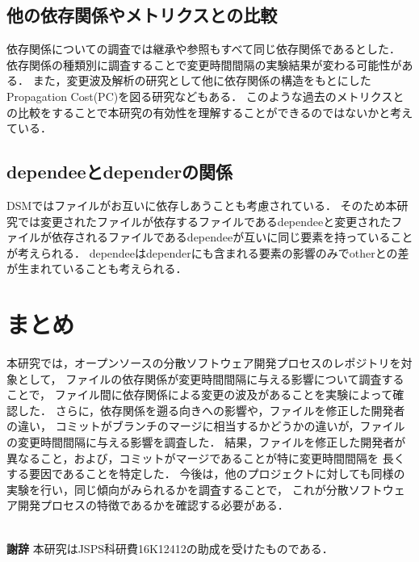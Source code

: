 \documentclass{fose2016}           %
\begin{document}
\subsection*{他の依存関係やメトリクスとの比較}
依存関係についての調査では継承や参照もすべて同じ依存関係であるとした．
依存関係の種類\cite{Kotani}別に調査することで変更時間間隔の実験結果が変わる可能性がある．
また，変更波及解析の研究として他に依存関係の構造をもとにしたPropagation Cost(PC)を図る研究などもある\cite{Nord}．
このような過去のメトリクスとの比較をすることで本研究の有効性を理解することができるのではないかと考えている．

\subsection*{dependeeとdependerの関係}
DSM\cite{Nord}ではファイルがお互いに依存しあうことも考慮されている．
そのため本研究では変更されたファイルが依存するファイルであるdependeeと変更されたファイルが依存されるファイルであるdependeeが互いに同じ要素を持っていることが考えられる．
dependeeはdependerにも含まれる要素の影響のみでotherとの差が生まれていることも考えられる．

\section{まとめ} \label{まとめ}
本研究では，オープンソースの分散ソフトウェア開発プロセスのレポジトリを対象として，
ファイルの依存関係が変更時間間隔に与える影響について調査することで，
ファイル間に依存関係による変更の波及があることを実験によって確認した．
さらに，依存関係を遡る向きへの影響や，ファイルを修正した開発者の違い，
コミットがブランチのマージに相当するかどうかの違いが，ファイルの変更時間間隔に与える影響を調査した．
結果，ファイルを修正した開発者が異なること，および，コミットがマージであることが特に変更時間間隔を
長くする要因であることを特定した．
今後は，他のプロジェクトに対しても同様の実験を行い，同じ傾向がみられるかを調査することで，
これが分散ソフトウェア開発プロセスの特徴であるかを確認する必要がある．

\noindent \\
{\bf 謝辞} 本研究はJSPS科研費16K12412の助成を受けたものである．
\end{document}
